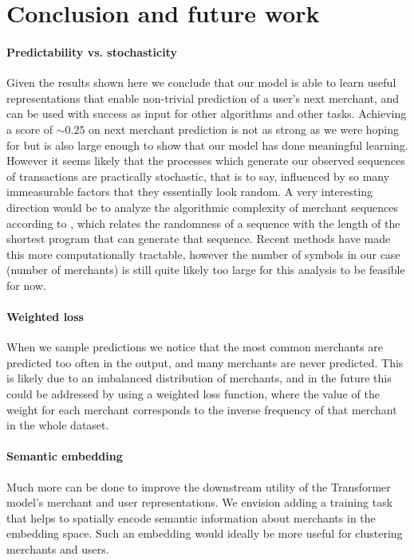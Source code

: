 \documentclass{article}
\begin{document}
\section{Conclusion and future work}
\paragraph{Predictability vs. stochasticity} Given the results shown here we conclude that our model is able to learn useful representations that enable non-trivial prediction of a user's next merchant, and can be used with success as input for other algorithms and other tasks. Achieving a score of $\sim0.25$ on next merchant prediction is not as strong as we were hoping for but is also large enough to show that our model has done meaningful learning. However it seems likely that the processes which generate our observed sequences of transactions are practically stochastic, that is to say, influenced by so many immeasurable factors that they essentially look random. A very interesting direction would be to analyze the algorithmic complexity of merchant sequences according to \cite{Gauvrit:2011}, which relates the randomness of a sequence with the length of the shortest program that can generate that sequence. Recent methods \cite{Zenil:2012} have made this more computationally tractable, however the number of symbols in our case (number of merchants) is still quite likely too large for this analysis to be feasible for now.

\paragraph{Weighted loss} When we sample predictions we notice that the most common merchants are predicted too often in the output, and many merchants are never predicted. This is likely due to an imbalanced distribution of merchants, and in the future this could be addressed by using a weighted loss function, where the value of the weight for each merchant corresponds to the inverse frequency of that merchant in the whole dataset.

\paragraph{Semantic embedding} Much more can be done to improve the downstream utility of the Transformer model's merchant and user representations. We envision adding a training task that helps to spatially encode semantic information about merchants in the embedding space. Such an embedding would ideally be more useful for clustering merchants and users.
\end{document}
